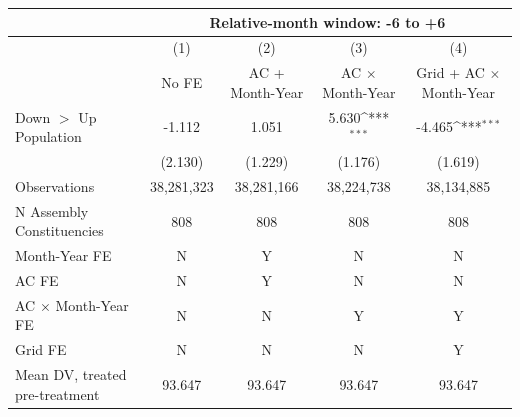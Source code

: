 {
\def\sym#1{\ifmmode^{#1}\else\(^{#1}\)\fi}
\begin{tabular}{l*{4}{c}}
\hline
&\multicolumn{4}{c}{Relative-month window: -6 to +6} \\ \hline
            &\multicolumn{1}{c}{(1)}&\multicolumn{1}{c}{(2)}&\multicolumn{1}{c}{(3)}&\multicolumn{1}{c}{(4)}\\
            &\multicolumn{1}{c}{No FE}&\multicolumn{1}{c}{AC + Month-Year}&\multicolumn{1}{c}{AC $\times$ Month-Year}&\multicolumn{1}{c}{Grid + AC $\times$ Month-Year}\\
\hline
Down $>$ Up Population&      -1.112         &       1.051         &       5.630\sym{***}&      -4.465\sym{***}\\
            &     (2.130)         &     (1.229)         &     (1.176)         &     (1.619)         \\
\hline
Observations&  38,281,323         &  38,281,166         &  38,224,738         &  38,134,885         \\
N Assembly Constituencies&         808         &         808         &         808         &         808         \\
Month-Year FE&           N         &           Y         &           N         &           N         \\
AC FE       &           N         &           Y         &           N         &           N         \\
AC $\times$ Month-Year FE&           N         &           N         &           Y         &           Y         \\
Grid FE     &           N         &           N         &           N         &           Y         \\
Mean DV, treated pre-treatment&      93.647         &      93.647         &      93.647         &      93.647         \\
\hline
\end{tabular}
}
